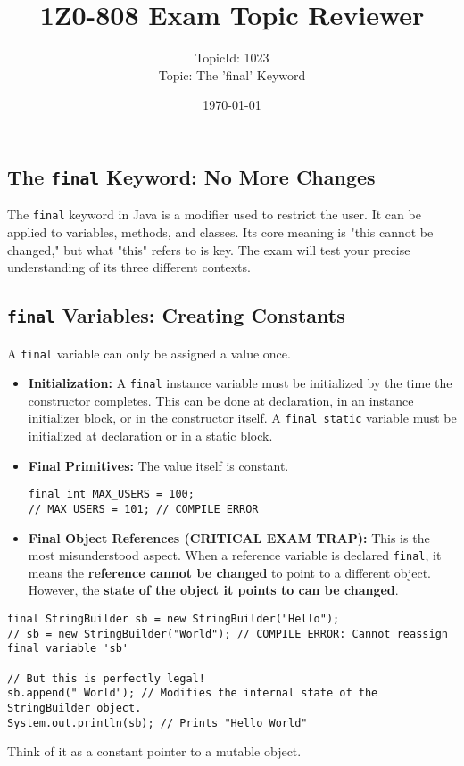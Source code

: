 \documentclass[12pt]{article}
\title{\textbf{1Z0-808 Exam Topic Reviewer}}
\author{TopicId: 1023 \\ Topic: The 'final' Keyword}
\date{\today}
\begin{document}
\maketitle
\newpage\begin{enumerate}[label=(\arabic*)]
\section*{The \texttt{final} Keyword: No More Changes}
The \texttt{final} keyword in Java is a modifier used to restrict the user. It can be applied to variables, methods, and classes. Its core meaning is "this cannot be changed," but what "this" refers to is key. The exam will test your precise understanding of its three different contexts.

\subsection{\texttt{final} Variables: Creating Constants}
A \texttt{final} variable can only be assigned a value once.
\begin{itemize}
    \item \textbf{Initialization:} A \texttt{final} instance variable must be initialized by the time the constructor completes. This can be done at declaration, in an instance initializer block, or in the constructor itself. A \texttt{final static} variable must be initialized at declaration or in a static block.
    \item \textbf{Final Primitives:} The value itself is constant.
\begin{verbatim}
final int MAX_USERS = 100;
// MAX_USERS = 101; // COMPILE ERROR
\end{verbatim}
    \item \textbf{Final Object References (CRITICAL EXAM TRAP):} This is the most misunderstood aspect. When a reference variable is declared \texttt{final}, it means the \textbf{reference cannot be changed} to point to a different object. However, the \textbf{state of the object it points to can be changed}.
\end{itemize}
\begin{verbatim}
final StringBuilder sb = new StringBuilder("Hello");
// sb = new StringBuilder("World"); // COMPILE ERROR: Cannot reassign final variable 'sb'

// But this is perfectly legal!
sb.append(" World"); // Modifies the internal state of the StringBuilder object.
System.out.println(sb); // Prints "Hello World"
\end{verbatim}
Think of it as a constant pointer to a mutable object.


\end{enumerate}
\end{document}
